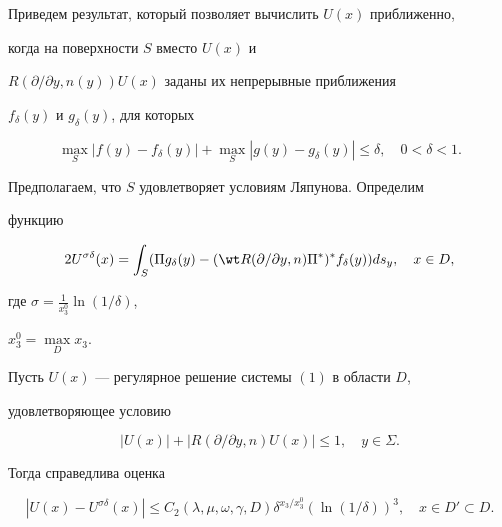  


Приведем результат, который позволяет вычислить $U(x)$ приближенно, 


когда на поверхности $S$ вместо $U(x)$ и 


$R(\partial/\partial y,n(y))U(x)$ заданы их непрерывные приближения 


$f_\delta(y)$ и $g_\delta(y)$, для которых 


\begin{equation} 


\max_S|f(y)-f_\delta(y)|+\max_S|g(y)-g_\delta(y)|\le \delta,\quad 


0<\delta<1. 


\end{equation} 


Предполагаем, что $S$ удовлетворяет условиям Ляпунова. Определим 


функцию 


\begin{equation} 


2U^{\sigma\delta}(x)=\int_S(\Pi g_\delta(y)- 


(\wt R(\partial/\partial y,n)\Pi^*)^* f_\delta(y))ds_y,\quad x\in D, 


\end{equation} 


где $\sigma=\frac{1}{x^0_3}\ln(1/\delta)$, 


$x^0_3=\max\limits_D x_3$. 


 


\begin{thm} 


Пусть $U(x)$ --- регулярное решение системы $(1)$ в области $D$, 


удовлетворяющее условию 


$$ 


|U(x)|+|R(\partial/\partial y,n)U(x)|\le 1,\quad y\in\Sigma. 


$$ 


Тогда справедлива оценка 


$$ 


|U(x)-U^{\sigma\delta}(x)|\le C_2(\lambda,\mu,\omega,\gamma,D) 


\delta^{x_3/x^0_3}(\ln(1/\delta))^3,\quad x\in D'\subset D. 


$$ 


\end{thm} 


 


